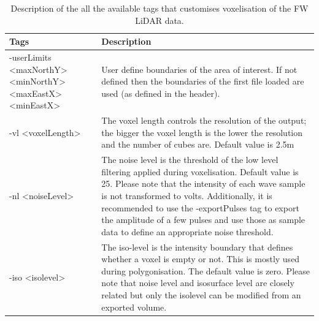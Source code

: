 \documentclass{subfiles}
\begin{document}
			
			\begin{table}[!htbp]
			\centering
				\begin{tabular}{|p{2.8cm}|p{10.7cm}|}
					\toprule
					\textbf{Tags}  & \textbf{Description}  \\
					\midrule
					-userLimits \newline<maxNorthY> \newline<minNorthY> \newline<maxEastX>\newline <minEastX> & User define boundaries of the area of interest. If not defined then the boundaries of the first file loaded are used (as defined in the header).\\
					\cmidrule(r){1-1}\cmidrule(l){2-2}
					-vl <voxelLength>   & The voxel length controls the resolution of the output; the bigger the voxel length is the lower the resolution and the number of cubes are. Default value is 2.5m\\
					\midrule
					-nl <noiseLevel>  &  The noise level is the threshold of the low level filtering applied during voxelisation. Default value is 25. Please note that the intensity of each wave sample is not transformed to volts. 
					Additionally, it is recommended to use the -exportPulses tag to export the amplitude of a few pulses and use those as sample data to define an appropriate noise threshold. \\
					\cmidrule(r){1-1}\cmidrule(l){2-2}
					-iso <isolevel>    & The iso-level is the intensity boundary that defines whether a voxel is empty or not. This is mostly used during polygonisation. The default value is zero. Please note that noise level and isosurface level are closely related but only the isolevel can be modified from an exported volume.\\			
					
					\bottomrule
				\end{tabular}
				\caption{Description of the all the available tags that customises voxelisation of the FW LiDAR data.}
				\label{table:parameters}
			\end{table}
			
\end{document}

